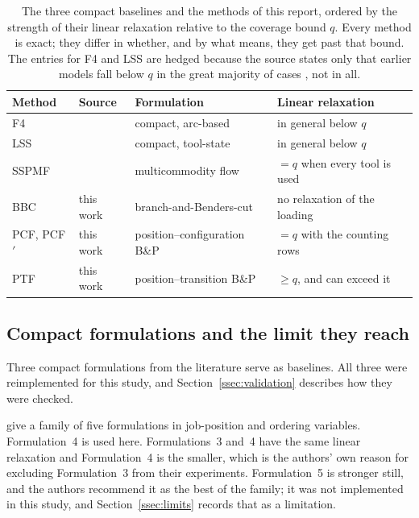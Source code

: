 \begin{table}[t]\centering
\footnotesize
\begin{tabular}{@{}llll@{}}
\toprule
Method & Source & Formulation & Linear relaxation \\
\midrule
F4          & \citet{Catanzaro2015} & compact, arc-based            & in general below $q$ \\
LSS         & \citet{Laporte2004}   & compact, tool-state           & in general below $q$ \\
SSPMF       & \citet{daSilva2024}   & multicommodity flow           & $=q$ when every tool is used \\
BBC         & this work             & branch-and-Benders-cut        & no relaxation of the loading \\
PCF, PCF$'$ & this work             & position--configuration B\&P  & $=q$ with the counting rows \\
PTF         & this work             & position--transition B\&P     & $\ge q$, and can exceed it \\
\bottomrule
\end{tabular}
\caption{The three compact baselines and the methods of this report, ordered by the
strength of their linear relaxation relative to the coverage bound $q$. Every method
is exact; they differ in whether, and by what means, they get past that bound. The
entries for F4 and LSS are hedged because the source states only that earlier models
fall below $q$ in the great majority of cases \citep{daSilva2024}, not in all.}
\label{tab:methods}
\end{table}

\subsection{Compact formulations and the limit they reach}\label{ssec:compact}

Three compact formulations from the literature serve as baselines. All three were
reimplemented for this study, and Section~\ref{ssec:validation} describes how they
were checked.

\citet{Catanzaro2015} give a family of five formulations in job-position and ordering
variables. Formulation~4 is used here. Formulations~3 and~4 have the same linear
relaxation and Formulation~4 is the smaller, which is the authors' own reason for
excluding Formulation~3 from their experiments. Formulation~5 is stronger still, and
the authors recommend it as the best of the family; it was not implemented in this
study, and Section~\ref{ssec:limits} records that as a limitation.


